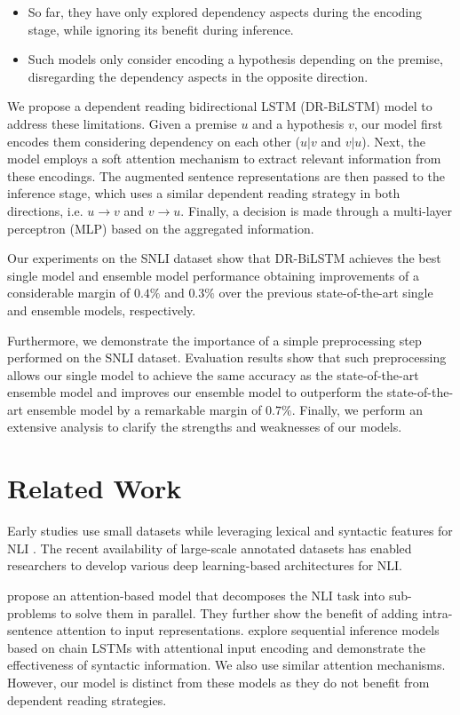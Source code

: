 \documentclass[11pt,a4paper]{article}
\begin{document}
	\begin{itemize}
		\item So far, they have only explored dependency aspects during the encoding stage, while ignoring its benefit during inference.
		\item Such models only consider encoding a hypothesis depending on the premise, disregarding the dependency aspects in the opposite direction.
	\end{itemize}
	
	We propose a dependent reading bidirectional LSTM (DR-BiLSTM) model to address these limitations. Given a premise $u$ and a hypothesis $v$, our model first encodes them considering dependency on each other ($u|v$ and $v|u$). Next, the model employs a soft attention mechanism to extract relevant information from these encodings. The augmented sentence representations are then passed to the inference stage, which uses a similar dependent reading strategy in both directions, i.e. $u \rightarrow v$ and $v \rightarrow u$. Finally, a decision is made through a multi-layer perceptron (MLP) based on the aggregated information. 
	
	Our experiments on the SNLI dataset show that DR-BiLSTM achieves the best single model and ensemble model performance obtaining improvements of a considerable margin of $0.4\%$ and $0.3\%$ over the previous state-of-the-art single and ensemble models, respectively. 
	
	Furthermore, we demonstrate the importance of a simple preprocessing step performed on the SNLI dataset. Evaluation results show that such preprocessing allows our single model to achieve the same accuracy as the state-of-the-art ensemble model and improves our ensemble model to outperform the state-of-the-art ensemble model by a remarkable margin of $0.7\%$. Finally, we perform an extensive analysis to clarify the strengths and weaknesses of our models. 
	
	\section{Related Work}
	Early studies use small datasets while leveraging lexical and syntactic features for NLI \cite{nli}. The recent availability of large-scale annotated datasets \cite{snli,multinli} has enabled researchers to develop various deep learning-based architectures for NLI. 
	
	\citet{google2016} propose an attention-based model \cite{nmt} that decomposes the NLI task into sub-problems to solve them in parallel. They further show the benefit of adding intra-sentence attention to input representations. \citet{him2017} explore sequential inference models based on chain LSTMs with attentional input encoding and demonstrate the effectiveness of syntactic information. We also use similar attention mechanisms. However, our model is distinct from these models as they do not benefit from dependent reading strategies.
	
\end{document}
